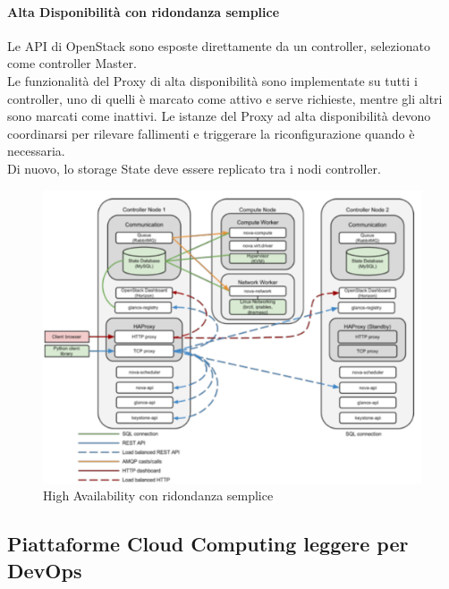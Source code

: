 \documentclass{article}
\begin{document}
\paragraph{Alta Disponibilità con ridondanza semplice}
Le API di OpenStack sono esposte direttamente da un controller, selezionato come controller Master. \\
Le funzionalità del Proxy di alta disponibilità sono implementate su tutti i controller, uno di quelli è marcato come attivo e serve richieste, mentre gli altri sono marcati come inattivi. Le istanze del Proxy ad alta disponibilità devono coordinarsi per rilevare fallimenti e triggerare la riconfigurazione quando è necessaria. \\ 
Di nuovo, lo storage State deve essere replicato tra i nodi controller.
\begin{figure}[H]
    \centering
    \includegraphics[scale=0.3]{img/high availability 3.png}
    \caption{High Availability con ridondanza semplice}
\end{figure}\noindent

\subsection{Piattaforme Cloud Computing leggere per DevOps}
\end{document}
